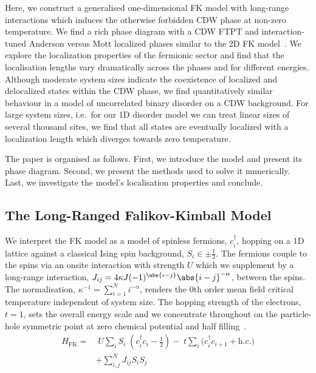 Here, we construct a generalised one-dimensional FK model with long-range interactions which induces the otherwise forbidden CDW phase at non-zero temperature. We find a rich phase diagram with a CDW FTPT and interaction-tuned Anderson versus Mott localized phases similar to the 2D FK model~\autocite{antipovInteractionTunedAndersonMott2016}. We explore the localization properties of the fermionic sector and find that the localisation lengths vary dramatically across the phases and for different energies. Although moderate system sizes indicate the coexistence of localized and delocalized states within the CDW phase, we find quantitatively similar behaviour in a model of uncorrelated binary disorder on a CDW background. For large system sizes, i.e.~for our 1D disorder model we can treat linear sizes of several thousand sites, we find that all states are eventually localized with a localization length which diverges towards zero temperature.

The paper is organised as follows. First, we introduce the model and present its phase diagram. Second, we present the methods used to solve it numerically. Last, we investigate the model's localisation properties and conclude.

\hypertarget{the-long-ranged-falikov-kimball-model}{%
\subsection{The Long-Ranged Falikov-Kimball Model}\label{the-long-ranged-falikov-kimball-model}}

We interpret the FK model as a model of spinless fermions, \(c^\dag_{i}\), hopping on a 1D lattice against a classical Ising spin background, \(S_i \in {\pm \frac{1}{2}}\). The fermions couple to the spins via an onsite interaction with strength \(U\) which we supplement by a long-range interaction, \(J_{ij} = 4\kappa J (-1)^{\abs{i-j}} \abs{i-j}^{-\alpha}\), between the spins. The normalisation, \(\kappa^{-1} = \sum_{i=1}^{N} i^{-\alpha}\), renders the 0th order mean field critical temperature independent of system size. The hopping strength of the electrons, \(t = 1\), sets the overall energy scale and we concentrate throughout on the particle-hole symmetric point at zero chemical potential and half filling~\autocite{gruberFalicovKimballModelReview1996}. ~ \[\begin{aligned}
H_{\mathrm{FK}} = & \;U \sum_{i} S_i\;(c^\dag_{i}c_{i} - \tfrac{1}{2}) -\;t \sum_{i} (c^\dag_{i}c_{i+1} + \textit{h.c.)}\\ 
 &  + \sum_{i, j}^{N} J_{ij}  S_i S_j \nonumber
\label{eq:HFK}\end{aligned}\]

